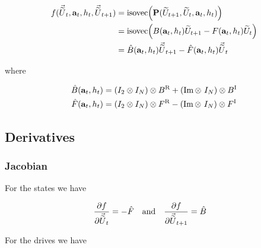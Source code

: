 \documentclass{article}
\newcommand{\isoU}{\widetilde{U}}
\newcommand{\isovecU}{\vec{\widetilde{U}}}
\newcommand{\isovec}{\text{isovec}}
\newcommand{\BR}{B^{\text{R}}}
\newcommand{\BI}{B^{\text{I}}}
\newcommand{\FR}{F^{\text{R}}}
\newcommand{\FI}{F^{\text{I}}}
\newcommand{\UR}{U^{\text{R}}}
\newcommand{\UI}{U^{\text{I}}}
\begin{document}
\begin{align*}
  f(\isovecU_{t}, \vb{a}_t, h_t, \isovecU_{t+1}) &= \isovec\qty(\vb{P}(\isoU_{t+1}, \isoU_t, \vb{a}_t, h_t)) \\ 
  &= \isovec\qty(B(\vb{a}_t, h_t) \isoU_{t+1} - F(\vb{a}_t, h_t) \isoU_t) \\
  &= \hat B(\vb{a}_t, h_t) \isovecU_{t+1} - \hat F(\vb{a}_t, h_t) \isovecU_{t}
\end{align*}

where 

\begin{align*}
  \hat B(\vb{a}_t, h_t) &= \qty(I_2 \otimes I_N) \otimes \BR + (\Im \otimes \ I_N) \otimes \BI \\
  \hat F(\vb{a}_t, h_t) &= \qty(I_2 \otimes I_N) \otimes \FR - (\Im \otimes \ I_N) \otimes \FI 
\end{align*}

\newpage

\subsection{Derivatives}

\subsubsection*{Jacobian}

For the states we have

\begin{align*}
  \pdv{f}{\isovecU_t} &= - \hat F \quad \text{and} \quad
  \pdv{f}{\isovecU_{t+1}} = \hat B
\end{align*}


For the drives we have
\end{document}
